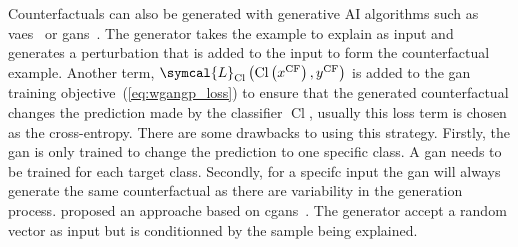 \documentclass[../main.tex]{subfiles}
\begin{document}
	Counterfactuals can also be generated with generative AI algorithms such as \glspl{vae}~\cite{mahajan2020preservingcausalconstraintscounterfactual} or \glspl{gan}~\cite{CounteRGAN,vanlooveren2021conditionalgenerativemodelscounterfactual,Yang2021ModelBasedCS}. 
	The generator takes the example to explain as input and generates a perturbation that is added to the input to form the counterfactual example.
	Another term, \(\symcal{L}_{\operatorname{Cl}}\left(\operatorname{Cl}\left(x^{\text{CF}}\right), y^{\text{CF}}\right)\) is added to the \gls{gan} training objective~(\cref{eq:wgangp_loss}) to ensure that the generated counterfactual changes the prediction made by the classifier \(\operatorname{Cl}\), usually this loss term is chosen as the cross-entropy.
	There are some drawbacks to using this strategy. 
	Firstly, the \gls{gan} is only trained to change the prediction to one specific class. 
	A \gls{gan} needs to be trained for each target class. 
	Secondly, for a specifc input the \gls{gan} will always generate the same counterfactual as there are variability in the generation process. 
	\citeauthor{Yang2021ModelBasedCS} proposed an approache based on \glspl{cgan}~\cite{Yang2021ModelBasedCS}. 
	The generator accept a random vector as input but is conditionned by the sample being explained. 
	
\end{document}
